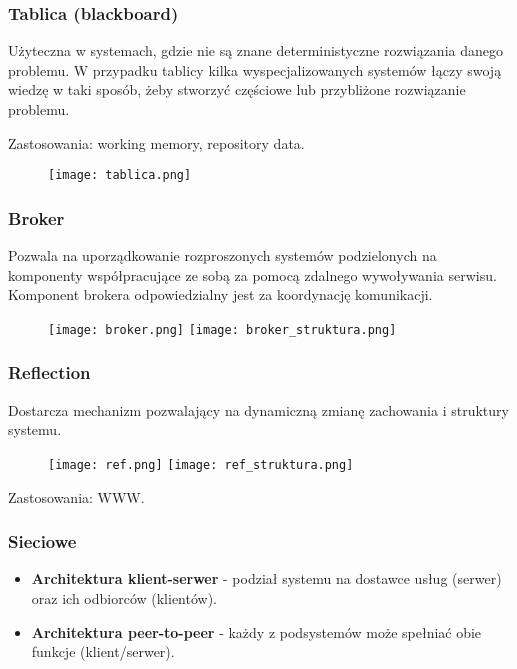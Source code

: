 \documentclass[../main.tex]{subfiles}
\begin{document}
    \subsubsection{Tablica (blackboard)}
    Użyteczna w systemach, gdzie nie są znane deterministyczne rozwiązania danego problemu. W przypadku tablicy kilka wyspecjalizowanych
    systemów łączy swoją wiedzę w taki sposób, żeby stworzyć częściowe lub przybliżone rozwiązanie problemu.

    Zastosowania: working memory, repository data.

    \begin{figure}[h]
        \texttt{[image: tablica.png]}
    \end{figure}



    \subsubsection{Broker}
    Pozwala na uporządkowanie rozproszonych systemów podzielonych na komponenty współpracujące ze sobą za pomocą zdalnego wywoływania
    serwisu. Komponent brokera odpowiedzialny jest za koordynację komunikacji.

    \begin{figure}[h]
        \texttt{[image: broker.png]}
        \texttt{[image: broker\_struktura.png]}
    \end{figure}

    \subsubsection{Reflection}
    Dostarcza mechanizm pozwalający na dynamiczną zmianę zachowania i struktury systemu.
    \begin{figure}[h]
        \texttt{[image: ref.png]}
        \texttt{[image: ref\_struktura.png]}
    \end{figure}

    Zastosowania: WWW.

    \subsubsection{Sieciowe}
    \begin{itemize}
        \item \textbf{Architektura klient-serwer} - podział systemu na dostawce usług (serwer) oraz ich odbiorców (klientów).
        \item \textbf{Architektura peer-to-peer} - każdy z podsystemów może spełniać obie funkcje (klient/serwer).

    \end{itemize}
\end{document}
